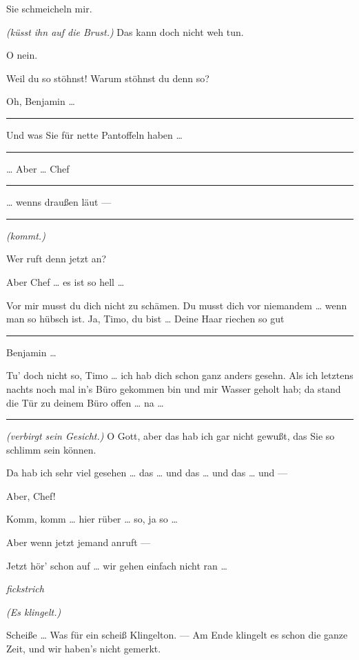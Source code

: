 \documentclass[
	final,
	a4paper,
	ngerman,
	mpinclude = true, %
	twoside = true,
	open = right,
	cleardoublepage = plain,
	DIV = 13,
	BCOR = 1cm,
	titlepage = firstiscover,
	]{scrbook}
\newcommand{\direction}[1]{\textit{(#1)}}
\newcommand{\hiat}{%
	\begin{center}
		\tiny
		\raisebox{0.5ex}{\rule{0.3\linewidth}{0.4pt}}
		\textit{fickstrich}
		\raisebox{0.5ex}{\rule{0.3\linewidth}{0.4pt}}
	\end{center}
}
\newenvironment{deletion}{%
		\vspace{0.25\baselineskip}
		\hrule
		\vspace{0.25\baselineskip}
		\color{darkgray}
	}{
		\color{black}
		\vspace{0.25\baselineskip}
		\hrule 
		\vspace{0.25\baselineskip}
	}
\newcommand{\thecharacter}[1]{\textup{\textsc{#1}}\xspace}
\newcommand{\thepraktikant}{\thecharacter{Timo}}
\newcommand{\theherr}{\thecharacter{Benjamin}}
\newcommand{\character}[1]{\item[#1:]}
\newcommand{\praktikant}{\character{\thepraktikant}}
\newcommand{\herr}{\character{\theherr}}
\begin{document}
\begin{play}
	\praktikant
	Sie schmeicheln mir.

	\herr
	\direction{küsst ihn auf die Brust.} Das kann doch nicht weh tun.

	\praktikant
	O nein.

	\herr
	Weil du so stöhnst! Warum stöhnst du denn so?

	\praktikant
	Oh, Benjamin \ldots{}

	\begin{deletion}
	\herr
	Und was Sie für nette Pantoffeln haben \ldots{}
	\end{deletion}

	\praktikant
	\ldots{} Aber \ldots{} Chef
	\begin{deletion}
		\ldots{} wenns draußen läut ---
	\end{deletion}
	\direction{kommt.}

	\herr
	Wer ruft denn jetzt an?

	\praktikant
	Aber Chef \ldots{} es ist so hell \ldots{}

	\herr
	Vor mir musst du dich nicht zu schämen. Du musst dich vor niemandem \ldots{} wenn man so hübsch ist. Ja, Timo, du bist \ldots{} Deine Haar riechen so gut

	\begin{deletion}
	\praktikant
	Benjamin \ldots{}

	\herr
	Tu' doch nicht so, Timo \ldots{} ich hab dich schon ganz anders gesehn. Als ich letztens nachts noch mal in's Büro gekommen bin und mir Wasser geholt hab; da stand die Tür zu deinem Büro offen \ldots{} na \ldots{}
	\end{deletion}

	\praktikant
	\direction{verbirgt sein Gesicht.} O Gott, aber das hab ich gar nicht gewußt, das Sie so schlimm sein können.

	\herr
	Da hab ich sehr viel gesehen \ldots{} das \ldots{} und das \ldots{} und das \ldots{} und ---

	\praktikant
	Aber, Chef!

	\herr
	Komm, komm \ldots{} hier rüber \ldots{} so, ja so \ldots{}

	\praktikant
	Aber wenn jetzt jemand anruft ---

	\herr
	Jetzt hör' schon auf \ldots{} wir gehen einfach nicht ran \ldots{}

	\hiat

	\direction{Es klingelt.}

	\herr
	Scheiße \ldots{} Was für ein scheiß Klingelton. --- Am Ende klingelt es schon die ganze Zeit, und wir haben's nicht gemerkt.


\end{play}
\end{document}
